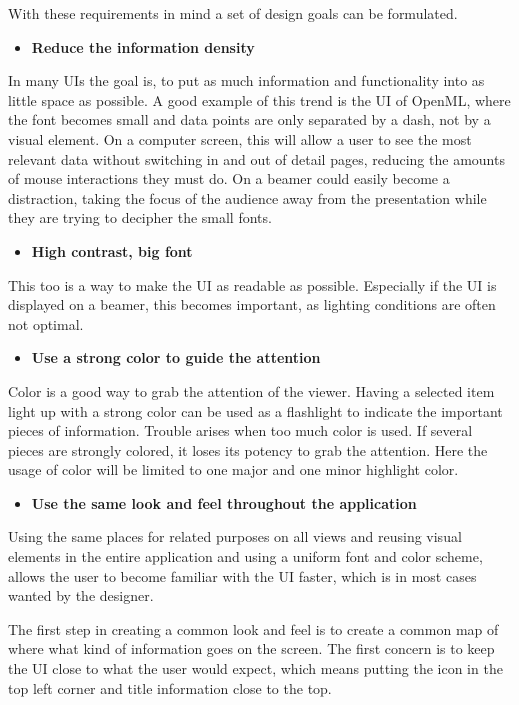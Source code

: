 \noindent
With these requirements in mind a set of design goals can be formulated.
\begin{itemize}
\item \textbf{Reduce the information density}
\end{itemize}
In many UIs the goal is, to put as much information and functionality into as little space as possible. A good example of this trend is the UI of OpenML, where the font becomes small and data points are only separated by a dash, not by a visual element. On a computer screen, this will allow a user to see the most relevant data without switching in and out of detail pages, reducing the amounts of mouse interactions they must do. On a beamer could easily become a distraction, taking the focus of the audience away from the presentation while they are trying to decipher the small fonts. 
\begin{itemize}
\item \textbf{High contrast, big font}
\end{itemize}
This too is a way to make the UI as readable as possible. Especially if the UI is displayed on a beamer, this becomes important, as lighting conditions are often not optimal.
\begin{itemize}
\item \textbf{Use a strong color to guide the attention}
\end{itemize}
Color is a good way to grab the attention of the viewer. Having a selected item light up with a strong color can be used as a flashlight to indicate the important pieces of information. Trouble arises when too much color is used. If several pieces are strongly colored, it loses its potency to grab the attention. Here the usage of color will be limited to one major and one minor highlight color.
\begin{itemize}
\item \textbf{Use the same look and feel throughout the application}
\end{itemize}
Using the same places for related purposes on all views and reusing visual elements in the entire application and using a uniform font and color scheme, allows the user to become familiar with the UI faster, which is in most cases wanted by the designer. 

The first step in creating a common look and feel is to create a common map of where what kind of information goes on the screen. The first concern is to keep the UI close to what the user would expect, which means putting the icon in the top left corner and title information close to the top. 

